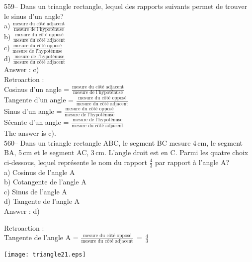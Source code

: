 ﻿\documentclass[letterpaper, 12pt]{article}
\begin{document}
559-- Dans un triangle rectangle, lequel des rapports suivants permet de
trouver le sinus d'un angle?\\[2mm]
a) $\frac{\textrm{mesure du c\^ot\'e adjacent}}{\textrm{mesure de
l'hypot\'enuse}}$\\[2mm]
b) $\frac{\textrm{mesure du c\^ot\'e oppos\'e}}{\textrm{mesure du c\^ot\'e
adjacent}}$\\[2mm]
c) $\frac{\textrm{mesure du c\^ot\'e oppos\'e}}{\textrm{mesure de
l'hypot\'enuse}}$\\[2mm]
d) $\frac{\textrm{mesure de l'hypot\'enuse}}{\textrm{mesure du c\^ot\'e
adjacent}}$\\

Answer : c)\\

Retroaction : \\
Cosinus d'un angle = $\frac{\textrm{mesure du c\^ot\'e
adjacent}}{\textrm{mesure de l'hypot\'enuse}}$\\[2mm]
Tangente d'un angle = $\frac{\textrm{mesure du c\^ot\'e
oppos\'e}}{\textrm{mesure du c\^ot\'e adjacent}}$\\[2mm]
Sinus d'un angle = $\frac{\textrm{mesure du c\^ot\'e
oppos\'e}}{\textrm{mesure de l'hypot\'enuse}}$\\[2mm]
S\'ecante d'un angle =  $\frac{\textrm{mesure de
l'hypot\'enuse}}{\textrm{mesure du c\^ot\'e adjacent}}$\\[2mm]
The answer is c).\\

560-- Dans un triangle rectangle ABC, le segment BC mesure 4\,cm, le segment
BA, 5\,cm et le segment AC, 3\,cm.  L'angle droit est en C.  Parmi les
quatre choix ci-dessous, lequel repr\'esente le nom du rapport $\frac{4}{3}$
par rapport \`a l'angle A?\\
a) Cosinus de l'angle A\\
b) Cotangente de l'angle A\\
c) Sinus de l'angle A\\
d) Tangente de l'angle A\\

Answer : d)

Retroaction : \\
Tangente de l'angle A = $\frac{\textrm{mesure du c\^ot\'e
oppos\'e}}{\textrm{mesure du c\^ot\'e
adjacent}}\,=\,\frac{\textrm{4}}{\textrm{3}}$\\
    \begin{center}
    \texttt{[image: triangle21.eps]}
    \end{center}
\end{document}
